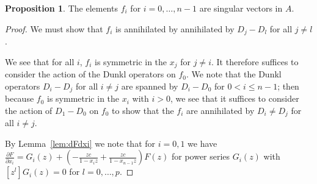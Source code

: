 \documentclass{amsart}
\numberwithin{equation}{section}
\theoremstyle{definition}
\newtheorem{proposition}[theorem]{Proposition}
\begin{document}
\begin{proposition}\label{prop:ann} 
The elements $f_i$ for $i=0,\dots,n-1$ are singular vectors in $A$.
\end{proposition}
\begin{proof}
We must show that $f_i$ is annihilated by annihilated by $D_j-D_l$ for all $j \ne l$.

We see that for all $i$, $f_i$ is symmetric in the $x_j$ for $j \ne i$. It therefore suffices to consider the action of the Dunkl operators on $f_0$. We note that the Dunkl operators $D_i-D_j$ for all $i \ne j$ are spanned by $D_i-D_0$ for $0<i \le n-1$; then because $f_0$ is symmetric in the $x_i$ with $i > 0$, we see that it suffices to consider the action of $D_1-D_0$ on $f_0$ to show that the $f_i$ are annihilated by $D_i \ne D_j$ for all $i \ne j$. 

By Lemma~\ref{lem:dFdxi} we note that for $i=0,1$ we have $\frac{\partial F}{\partial x_i} = G_i(z)+\left(-\frac{zc}{1-x_iz}+\frac{zc}{1-x_{n-1}z}\right)F(z)$ for power series $G_i(z)$ with $[z^l]G_i(z)=0$ for $l=0,\dots,p$.


\end{proof}
\end{document}
